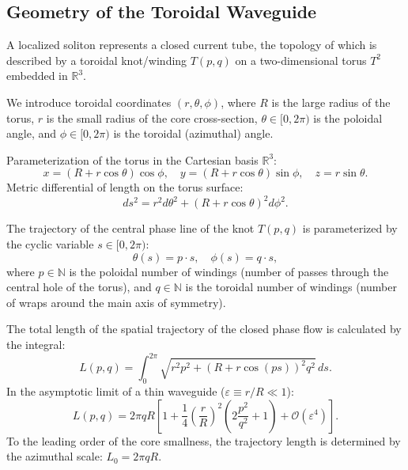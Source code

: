 \documentclass[12pt,a4paper]{article}
\begin{document}
	\subsection{Geometry of the Toroidal Waveguide}
	A localized soliton represents a closed current tube, the topology of which is described by a toroidal knot/winding $T(p,q)$ on a two-dimensional torus $T^2$ embedded in $\mathbb{R}^3$.
	
	We introduce toroidal coordinates $(r, \theta, \phi)$, where $R$ is the large radius of the torus, $r$ is the small radius of the core cross-section, $\theta \in [0, 2\pi)$ is the poloidal angle, and $\phi \in [0, 2\pi)$ is the toroidal (azimuthal) angle.
	
	Parameterization of the torus in the Cartesian basis $\mathbb{R}^3$:
	\begin{equation}
	x = (R + r \cos\theta) \cos\phi, \quad y = (R + r \cos\theta) \sin\phi, \quad z = r \sin\theta.
	\end{equation}
	Metric differential of length on the torus surface:
	\begin{equation}
		ds^2 = r^2 d\theta^2 + (R + r \cos\theta)^2 d\phi^2.
	\end{equation}
	
	The trajectory of the central phase line of the knot $T(p,q)$ is parameterized by the cyclic variable $s \in [0, 2\pi)$:
	\begin{equation}
		\theta(s) = p \cdot s, \quad \phi(s) = q \cdot s,
	\end{equation}
	where $p \in \mathbb{N}$ is the poloidal number of windings (number of passes through the central hole of the torus), and $q \in \mathbb{N}$ is the toroidal number of windings (number of wraps around the main axis of symmetry).
	
	The total length of the spatial trajectory of the closed phase flow is calculated by the integral:
	\begin{equation}
		L(p,q) = \int_0^{2\pi} \sqrt{r^2 p^2 + (R + r \cos(ps))^2 q^2} \, ds.
	\end{equation}
	In the asymptotic limit of a thin waveguide ($\varepsilon \equiv r/R \ll 1$):
	\begin{equation}
		L(p,q) = 2\pi q R \left[ 1 + \frac{1}{4} \left(\frac{r}{R}\right)^2 \left( 2\frac{p^2}{q^2} + 1 \right) + \mathcal{O}(\varepsilon^4) \right].
	\end{equation}
	To the leading order of the core smallness, the trajectory length is determined by the azimuthal scale: $L_0 = 2\pi q R$.
	
\end{document}
